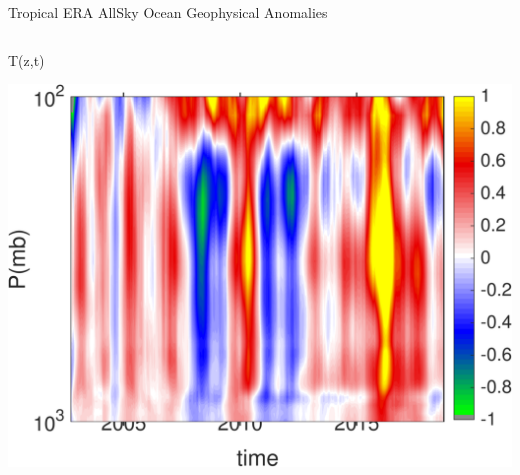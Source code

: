 \documentclass[10pt,t]{beamer}
\begin{document}
\begin{frame}{Tropical ERA AllSky Ocean Geophysical Anomalies}
\vspace{-0.35in}

\begin{columns}
\begin{column}{0.45\columnwidth}
\begin{block}{\footnotesize T(z,t)}
\vspace{-0.1in}
\begin{center}
\includegraphics[width=\linewidth]{Figs/CloudAnom/Desc_ocean_orig/era_cld_ptemp_anom_200209_201808.png}
\end{center}
\end{block}
\end{column}


\end{columns}
\end{frame}
\end{document}
